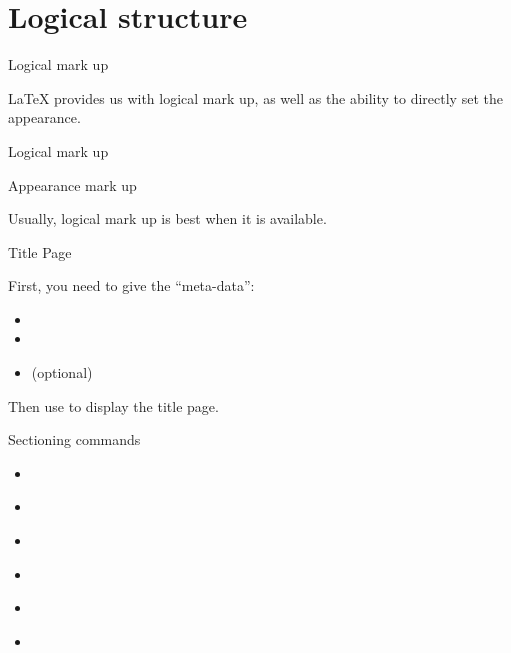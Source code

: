 
\section{Logical structure}

\begin{frame}[fragile]{Logical mark up}

  \LaTeX{} provides us with logical mark up, as well as the ability to directly set the appearance.
  \begin{block}{Logical mark up}
	\alert<2>{}\\
  \end{block}
  \begin{block}{Appearance mark up}
	\alert<2>{}\\
  \end{block}
  Usually, logical mark up is best when it is available.

\end{frame}

\begin{frame}{Title Page}

  First, you need to give the \enquote{meta-data}:
  \begin{itemize}
	\item {}
	\item {}
	\item {} (optional)
  \end{itemize}
  Then use  to display the title page.

\end{frame}

\begin{frame}{Sectioning commands}

  \begin{itemize}
	\item
	\alert<4>{\alert<2>{}\alert<3>{}}
	\item {}\alert<2>{}\alert<3>{}
	\item {}\alert<2>{}\alert<3>{}
	\item {}\alert<2>{}\alert<3>{}
	\item
	\alert<5>{\alert<2>{}\alert<3>{}}
	\item {}\alert<2>{}\alert<3>{}
  \end{itemize}

\end{frame}

